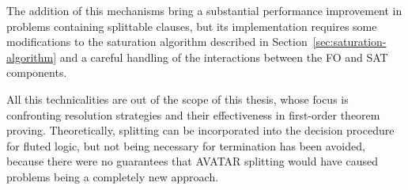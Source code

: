The addition of this mechanisms bring a substantial performance improvement in problems containing splittable clauses, but its implementation requires some modifications to the saturation algorithm described in Section~\ref{sec:saturation-algorithm} and a careful handling of the interactions between the FO and SAT components.

All this technicalities are out of the scope of this thesis, whose focus is confronting resolution strategies and their effectiveness in first-order theorem proving.
Theoretically, splitting can be incorporated into the decision procedure for fluted logic, but not being necessary for termination has been avoided, because there were no guarantees that AVATAR splitting would have caused problems being a completely new approach.
